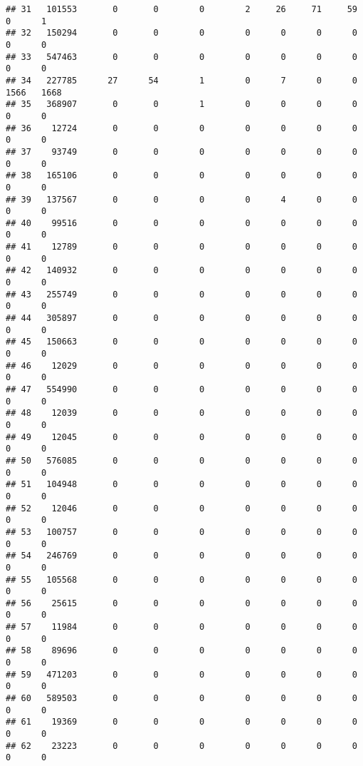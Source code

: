 \documentclass[
]{article}
\begin{document}
\begin{verbatim}
## 31   101553       0       0        0        2     26     71     59     0      1
## 32   150294       0       0        0        0      0      0      0     0      0
## 33   547463       0       0        0        0      0      0      0     0      0
## 34   227785      27      54        1        0      7      0      0  1566   1668
## 35   368907       0       0        1        0      0      0      0     0      0
## 36    12724       0       0        0        0      0      0      0     0      0
## 37    93749       0       0        0        0      0      0      0     0      0
## 38   165106       0       0        0        0      0      0      0     0      0
## 39   137567       0       0        0        0      4      0      0     0      0
## 40    99516       0       0        0        0      0      0      0     0      0
## 41    12789       0       0        0        0      0      0      0     0      0
## 42   140932       0       0        0        0      0      0      0     0      0
## 43   255749       0       0        0        0      0      0      0     0      0
## 44   305897       0       0        0        0      0      0      0     0      0
## 45   150663       0       0        0        0      0      0      0     0      0
## 46    12029       0       0        0        0      0      0      0     0      0
## 47   554990       0       0        0        0      0      0      0     0      0
## 48    12039       0       0        0        0      0      0      0     0      0
## 49    12045       0       0        0        0      0      0      0     0      0
## 50   576085       0       0        0        0      0      0      0     0      0
## 51   104948       0       0        0        0      0      0      0     0      0
## 52    12046       0       0        0        0      0      0      0     0      0
## 53   100757       0       0        0        0      0      0      0     0      0
## 54   246769       0       0        0        0      0      0      0     0      0
## 55   105568       0       0        0        0      0      0      0     0      0
## 56    25615       0       0        0        0      0      0      0     0      0
## 57    11984       0       0        0        0      0      0      0     0      0
## 58    89696       0       0        0        0      0      0      0     0      0
## 59   471203       0       0        0        0      0      0      0     0      0
## 60   589503       0       0        0        0      0      0      0     0      0
## 61    19369       0       0        0        0      0      0      0     0      0
## 62    23223       0       0        0        0      0      0      0     0      0

\end{verbatim}
\end{document}
